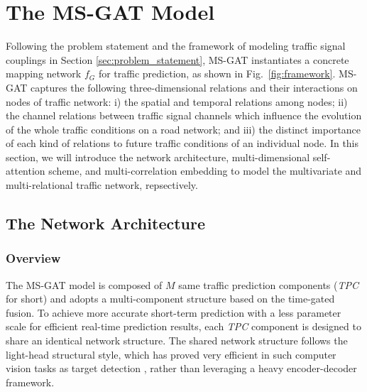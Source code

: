 \section{The MS-GAT Model}
\label{sec:the_ms-gat_model}

Following the problem statement and the framework of modeling traffic signal couplings in Section \ref{sec:problem_statement}, MS-GAT instantiates a concrete mapping network $f_G$ for traffic prediction, as shown in Fig.~\ref{fig:framework}. MS-GAT captures the following three-dimensional relations and their interactions on nodes of traffic network: i) the spatial and temporal relations among nodes; ii) the channel relations between traffic signal channels which influence the evolution of the whole traffic conditions on a road network; and iii) the distinct importance of each kind of relations to future traffic conditions of an individual node. In this section, we will introduce the network architecture, multi-dimensional self-attention scheme, and multi-correlation embedding to model the multivariate and multi-relational traffic network, repsectively. 

\subsection{The Network Architecture}
\label{ssec:the_network_architecture}

\subsubsection{Overview}
The MS-GAT model is composed of $M$ same traffic prediction components (\textit{TPC} for short) and adopts a multi-component structure based on the time-gated fusion. To achieve more accurate short-term prediction with a less parameter scale for efficient real-time prediction results, each \textit{TPC} component is designed to share an identical network structure. The shared network structure follows the light-head structural style, which has proved very efficient in such computer vision tasks as target detection \cite{li2017light}, rather than leveraging a heavy encoder-decoder framework.

